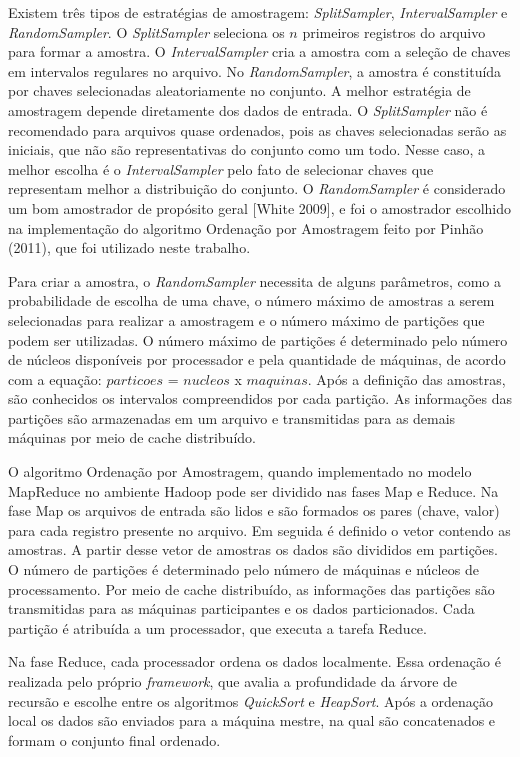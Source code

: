 Existem três tipos de estratégias de amostragem: \textit{SplitSampler}, \textit{IntervalSampler} e \textit{RandomSampler}. O \textit{SplitSampler} seleciona os $n$ primeiros registros do arquivo para formar a amostra. O \textit{IntervalSampler} cria a amostra com a seleção de chaves em intervalos regulares no arquivo. No \textit{RandomSampler}, a amostra é constituída por chaves selecionadas aleatoriamente no conjunto. A melhor estratégia de amostragem depende diretamente dos dados de entrada. O \textit{SplitSampler} não é recomendado para arquivos quase ordenados, pois as chaves selecionadas serão as iniciais, que não são representativas do conjunto como um todo. Nesse caso, a melhor escolha é o \textit{IntervalSampler} pelo fato de selecionar chaves que representam melhor a distribuição do conjunto. O \textit{RandomSampler} é considerado um bom amostrador de propósito geral [White 2009], e foi o amostrador escolhido na implementação do algoritmo Ordenação por Amostragem feito por Pinhão (2011), que foi utilizado neste trabalho.

Para criar a amostra, o \textit{RandomSampler} necessita de alguns parâmetros, como a probabilidade de escolha de uma chave, o número máximo de amostras a serem selecionadas para realizar a amostragem e o número máximo de partições que podem ser utilizadas.
O número máximo de partições é determinado pelo número de núcleos disponíveis por processador e pela quantidade de máquinas, de acordo com a equação: $particoes$ = $nucleos$ x $maquinas$.
Após a definição das amostras, são conhecidos os intervalos compreendidos por cada partição. As informações das partições são armazenadas em um arquivo e transmitidas para as demais máquinas por meio de cache distribuído.

O algoritmo Ordenação por Amostragem, quando implementado no modelo MapReduce no ambiente Hadoop pode ser dividido nas fases Map e Reduce.
Na fase Map os arquivos de entrada são lidos e são formados os pares (chave, valor) para cada registro presente no arquivo. 
Em seguida é definido o vetor contendo as amostras. A partir desse vetor de amostras os dados são divididos em partições. O número de partições é determinado pelo número de máquinas e núcleos de processamento. 
Por meio de cache distribuído, as informações das partições são transmitidas para as máquinas participantes e os dados particionados. Cada partição é atribuída a um processador, que executa a tarefa Reduce.

Na fase Reduce, cada processador ordena os dados localmente. Essa ordenação é realizada pelo próprio \textit{framework}, que avalia a profundidade da árvore de recursão e escolhe entre os  algoritmos \textit{QuickSort} e \textit{HeapSort}. 
Após a ordenação local os dados são enviados para a máquina mestre, na qual são concatenados e formam o conjunto final ordenado.

